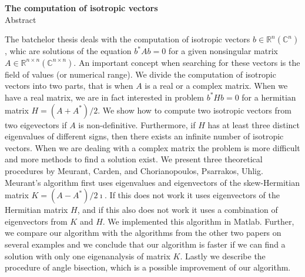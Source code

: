 \documentclass[12pt,a4paper]{amsart}
\theoremstyle{definition}
\theoremstyle{plain}
\newcommand{\R}{\mathbb R}
\newcommand{\C}{\mathbb C}
\begin{document}
\vfill
\begin{center}
{\bf The computation of isotropic vectors}\\[3mm]
{\sc Abstract}
\end{center}
The batchelor thesis deals with the computation of isotropic vectors $b\in\R^{n} (\C^{n})$, whic are solutions of the equation $b^\ast Ab=0$ for a given nonsingular matrix $A\in\R^{n\times n} (\C^{n\times n}).$
An important concept when searching for these vectors is the field of values (or numerical range). %
We divide the computation of isotropic vectors into two parts, that is when $A$ is a real or a complex matrix.
When we have a real matrix, we are in fact interested in problem $b^\ast Hb=0$ for a hermitian matrix $H=(A+A^\ast)/2$.
We show how to compute two isotropic vectors from two eigevectors if $A$ is non-definitive. Furthermore, if $H$ has at least three distinct eigenvalues of different signs, then there exists an infinite number of isotropic vectors.
When we are dealing with a complex matrix the problem is more difficult and more methods to find a solution exist. We present three theoretical procedures by Meurant, Carden, and Chorianopoulos, Psarrakos, Uhlig.
Meurant's algorithm first uses eigenvalues and eigenvectors of the skew-Hermitian matrix $K=(A-A^\ast)/2\imath.$ If this does not work it uses eigenvectors of the Hermitian matrix $H$, and if this also does not work it uses a combination of eigenvectors from $K$ and $H$.
We implemented this algorithm in Matlab.
Further, we compare our algorithm with the algorithms from the other two papers on several examples and we conclude that our algorithm is faster if we can find a solution with only one eigenanalysis of matrix $K$. %
Lastly we describe the procedure of angle bisection, which is a possible improvement of our algorithm.
\end{document}
